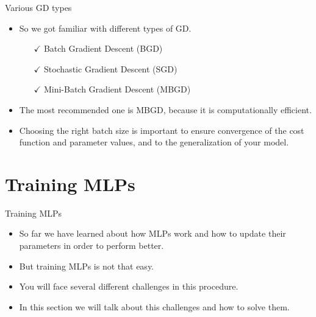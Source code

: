 \documentclass[compress,oilve,t]{beamer}
\begin{document}
\begin{frame}{Various GD types}
	\begin{itemize}
		\item So we got familiar with different types of GD.
		\begin{itemize}
			\item[\color{darkgreen}$\checkmark$] Batch Gradient Descent (BGD)
			\item[\color{darkgreen}$\checkmark$] Stochastic Gradient Descent (SGD)
			\item[\color{darkgreen}$\checkmark$] Mini-Batch Gradient Descent (MBGD)
		\end{itemize}
		\item[]
		\item[]
		\item The most recommended one is MBGD, because it is computationally efficient.
		\item Choosing the right batch size is important to ensure convergence of the cost function and parameter values, and to the generalization of your model.
	\end{itemize}
\end{frame}

\section{Training MLPs}
\begin{frame}{Training MLPs}
	\begin{itemize}
		\item So far we have learned about how MLPs work and how to update their parameters in order to perform better.
		\item But training MLPs is not that easy.
		\item You will face several different challenges in this procedure.
		\item In this section we will talk about this challenges and how to solve them.
	\end{itemize}
\end{frame}
\end{document}
